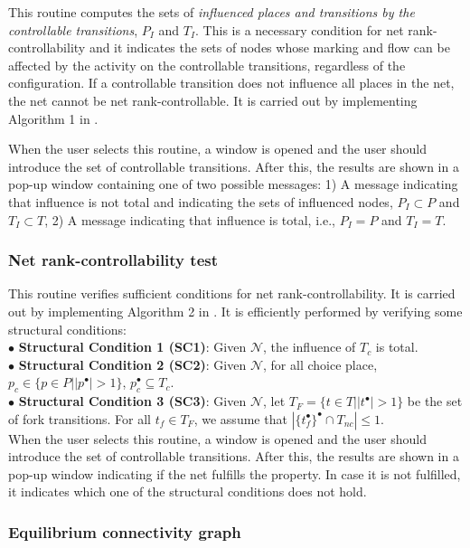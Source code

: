This routine computes the sets of \emph{influenced places and transitions by the controllable transitions}, $P_{I}$ and $T_{I}$. This is a necessary condition for net rank-controllability and it indicates the sets of nodes whose marking and flow can be affected by the activity on the controllable transitions, regardless of the configuration. If a controllable transition does not influence all places in the net, the net cannot be net rank-controllable. It is carried out by implementing Algorithm 1 in \cite{arzola2023structural}. 

When the user selects this routine, a window is opened and the user should introduce the set of controllable transitions. After this, the results are shown in a pop-up window containing one of two possible messages:  1) A message indicating that influence is not total and indicating the sets of influenced nodes, $P_I\subset P$ and $T_I\subset T$, 2) A message indicating that influence is total, i.e., $P_I=P$ and $T_I=T$.


\subsubsection{Net rank-controllability test}


This routine verifies sufficient conditions for net rank-controllability. It is carried out by implementing Algorithm 2 in \cite{arzola2023structural}. It is efficiently performed by verifying some structural conditions:\\
$\bullet$ \textbf{Structural Condition 1 (SC1)}: Given $\mathcal{N}$, the influence of $T_c$ is total.\\
$ \bullet$ \textbf{Structural Condition 2 (SC2)}: Given $\mathcal{N}$, for all choice place, $p_c\in \{p\in P | |p^{\bullet}|>1\}$, $p_c^\bullet\subseteq T_{c}$.\\
$ \bullet$ \textbf{Structural Condition 3 (SC3)}: Given $\mathcal{N}$, let $T_F = \{t\in T| |t^{\bullet}|>1\}$ be the set of fork transitions. For all $t_f\in T_F$, we assume that $| \{t_f^\bullet\}^\bullet\cap T_{nc}|\leq 1$.\\

When the user selects this routine, a window is opened and the user should introduce the set of controllable transitions. After this, the results are shown in a pop-up window indicating if the net fulfills the property. In case it is not fulfilled, it indicates which one of the structural conditions does not hold.


\subsubsection{Equilibrium connectivity graph}

